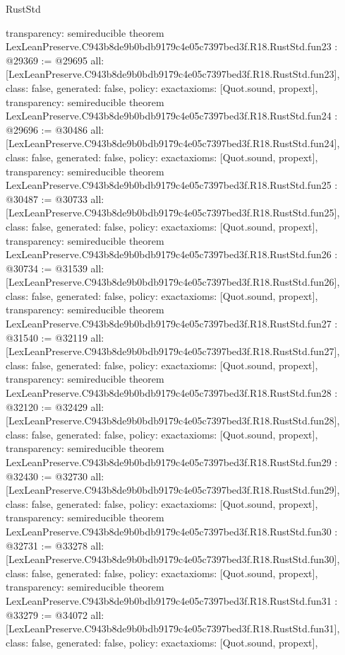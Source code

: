 \begin{lexlean}{RustStd}
\begin{coremodule}
{  transparency: semireducible
}
theorem LexLeanPreserve.C943b8de9b0bdb9179c4e05c7397bed3f.R18.RustStd.fun23 : @29369 := @29695 {
  all: [LexLeanPreserve.C943b8de9b0bdb9179c4e05c7397bed3f.R18.RustStd.fun23],
  class: false,
  generated: false,
  policy: exact{axioms: [Quot.sound, propext]},
  transparency: semireducible
}
theorem LexLeanPreserve.C943b8de9b0bdb9179c4e05c7397bed3f.R18.RustStd.fun24 : @29696 := @30486 {
  all: [LexLeanPreserve.C943b8de9b0bdb9179c4e05c7397bed3f.R18.RustStd.fun24],
  class: false,
  generated: false,
  policy: exact{axioms: [Quot.sound, propext]},
  transparency: semireducible
}
theorem LexLeanPreserve.C943b8de9b0bdb9179c4e05c7397bed3f.R18.RustStd.fun25 : @30487 := @30733 {
  all: [LexLeanPreserve.C943b8de9b0bdb9179c4e05c7397bed3f.R18.RustStd.fun25],
  class: false,
  generated: false,
  policy: exact{axioms: [Quot.sound, propext]},
  transparency: semireducible
}
theorem LexLeanPreserve.C943b8de9b0bdb9179c4e05c7397bed3f.R18.RustStd.fun26 : @30734 := @31539 {
  all: [LexLeanPreserve.C943b8de9b0bdb9179c4e05c7397bed3f.R18.RustStd.fun26],
  class: false,
  generated: false,
  policy: exact{axioms: [Quot.sound, propext]},
  transparency: semireducible
}
theorem LexLeanPreserve.C943b8de9b0bdb9179c4e05c7397bed3f.R18.RustStd.fun27 : @31540 := @32119 {
  all: [LexLeanPreserve.C943b8de9b0bdb9179c4e05c7397bed3f.R18.RustStd.fun27],
  class: false,
  generated: false,
  policy: exact{axioms: [Quot.sound, propext]},
  transparency: semireducible
}
theorem LexLeanPreserve.C943b8de9b0bdb9179c4e05c7397bed3f.R18.RustStd.fun28 : @32120 := @32429 {
  all: [LexLeanPreserve.C943b8de9b0bdb9179c4e05c7397bed3f.R18.RustStd.fun28],
  class: false,
  generated: false,
  policy: exact{axioms: [Quot.sound, propext]},
  transparency: semireducible
}
theorem LexLeanPreserve.C943b8de9b0bdb9179c4e05c7397bed3f.R18.RustStd.fun29 : @32430 := @32730 {
  all: [LexLeanPreserve.C943b8de9b0bdb9179c4e05c7397bed3f.R18.RustStd.fun29],
  class: false,
  generated: false,
  policy: exact{axioms: [Quot.sound, propext]},
  transparency: semireducible
}
theorem LexLeanPreserve.C943b8de9b0bdb9179c4e05c7397bed3f.R18.RustStd.fun30 : @32731 := @33278 {
  all: [LexLeanPreserve.C943b8de9b0bdb9179c4e05c7397bed3f.R18.RustStd.fun30],
  class: false,
  generated: false,
  policy: exact{axioms: [Quot.sound, propext]},
  transparency: semireducible
}
theorem LexLeanPreserve.C943b8de9b0bdb9179c4e05c7397bed3f.R18.RustStd.fun31 : @33279 := @34072 {
  all: [LexLeanPreserve.C943b8de9b0bdb9179c4e05c7397bed3f.R18.RustStd.fun31],
  class: false,
  generated: false,
  policy: exact{axioms: [Quot.sound, propext]},
}
\end{coremodule}
\end{lexlean}
